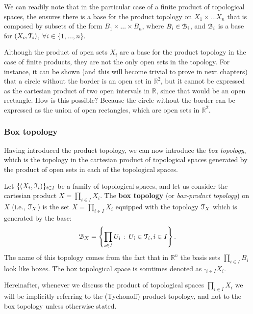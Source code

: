 We can readily note that in the particular case of a finite product of topological spaces,
the  ensures there is a base for the product topology
on $X_1\times\ldots X_n$ that is composed by subsets of the form $B_1\times\ldots\times B_n$,
where $B_i\in \EuScript{B}_i$, and $\EuScript{B}_i$ is a base for $(X_i, \EuScript{T}_i)$, $\forall i\in\{1,\ldots,n\}$.

\begin{remark}
	Although the product of open sets $X_i$ are a base for the product topology in the case of
	finite products, they are not the only open sets in the topology.
	For instance, it can be shown (and this will become trivial to prove in next chapters) that
	a circle without the border is an open set in $\mathbb{R}^2$, but it cannot be expressed as
	the cartesian product of two open intervals in $\mathbb{R}$, since that would be an open
	rectangle. How is this possible? Because the circle without the border can be expressed as the union
	of open rectangles, which are open sets in $\mathbb{R}^2$.
\end{remark}

\subsubsection{Box topology}\label{subsec:box-topology}

Having introduced the product topology, we can now introduce the \emph{box topology},
which is the topology in the cartesian product of topological spaces generated by the
product of open sets in each of the topological spaces.

\begin{definition}
	\label{def:box-topology}
	Let $\{(X_i, \EuScript{T}_i)\}_{i\in I}$ be a family of topological spaces, and let us consider
	the cartesian product $X=\prod_{i\in I} X_i$.
	The \textbf{box topology} (or \emph{box-product topology}) on $X$ (i.e., $\EuScript{T}_{X}$) is
	the set $X=\prod_{i\in I}X_i$ equipped with the topology $\EuScript{T}_X$ which is generated by the base:
	$$
		\EuScript{B}_X = \left\{\prod_{i\in I}U_i\,:\,U_i\in\EuScript{T}_i, i\in I\right\}.
	$$
	The name of this topology comes from the fact that in $\mathbb{R}^n$ the basis sets
	$\prod_{i\in I}B_i$ look like boxes.
	The box topological space is somtimes denoted as $\square_{i\in I}X_i$.
\end{definition}

Hereinafter, whenever we discuss the product of topological spaces
$\prod_{i\in I}X_i$ we will be implicitly referring to the (Tychonoff) product topology,
and not to the box topology unless otherwise stated.

